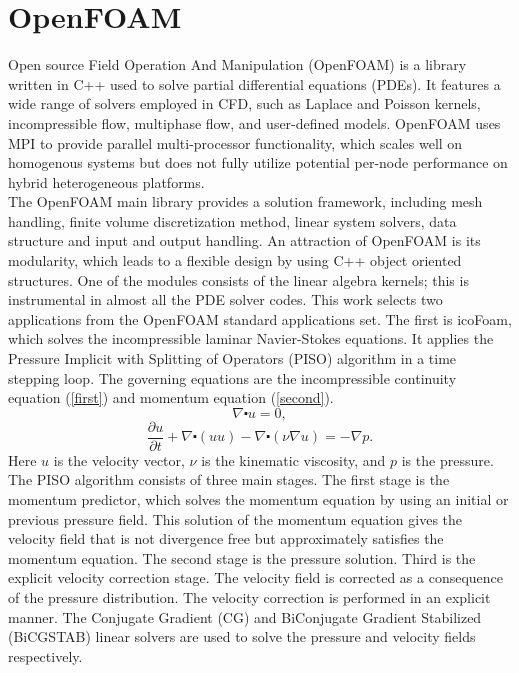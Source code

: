 \documentclass[3p,times]{elsarticle}
\begin{document}
\section{OpenFOAM}
\label{OpenFOAM}
Open source Field Operation And Manipulation (OpenFOAM) \cite{openfoam} is a library written in C++ used to solve partial differential equations (PDEs). It features a wide range of solvers employed in CFD, such as Laplace and Poisson kernels, incompressible flow, multiphase flow, and user-defined models. OpenFOAM uses MPI to provide parallel multi-processor functionality, which scales well on homogenous systems but does not fully utilize potential per-node performance on hybrid heterogeneous platforms. ~\\

The OpenFOAM main library provides a solution framework, including mesh handling, finite volume discretization method, linear system solvers, data structure and input and output handling. An attraction of OpenFOAM is its modularity, which leads to a flexible design by using C++ object oriented structures. One of the modules consists of the linear algebra kernels; this is instrumental in almost all the PDE solver codes. This work selects two applications from the OpenFOAM standard applications set. The first is icoFoam, which solves the incompressible laminar Navier-Stokes equations. It applies the Pressure Implicit with Splitting of Operators (PISO) \cite{piso} algorithm in a time stepping loop. The governing equations are the incompressible continuity equation (\ref{first}) and momentum equation (\ref{second}). 
\begin{equation}\label{first}
\nabla\centerdot u = 0 , 
\end{equation}
\begin{equation}\label{second}
 \frac{\partial u}{\partial t} + \nabla\centerdot (uu) - \nabla\centerdot (\nu \nabla u) = - \nabla p. 
\end{equation}
Here \emph{$u$} is the velocity vector, \emph{$\nu$} is the kinematic viscosity, and \emph{$p$} is the pressure. The PISO algorithm consists of three main stages. The first stage is the momentum predictor, which solves the momentum equation by using an initial or previous pressure field. This solution of the momentum equation gives the velocity field that is not divergence free but approximately satisfies the momentum equation. The second stage is the pressure solution. Third is the explicit velocity correction stage. The velocity field is corrected as a consequence of the pressure distribution. The velocity correction is performed in an explicit manner. The Conjugate Gradient (CG) and BiConjugate Gradient Stabilized (BiCGSTAB) linear solvers are used to solve the pressure and velocity fields respectively.\\
\end{document}
